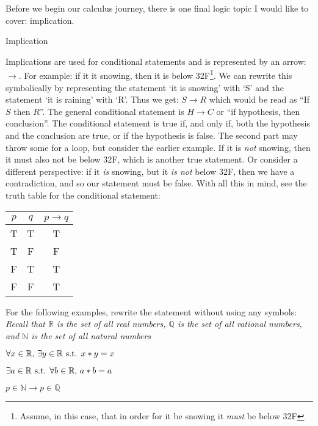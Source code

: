 Before we begin our calculus journey, there is one final logic topic I would like to cover: implication. 

\begin{definition}{Implication}{}
  
  Implications are used for conditional statements and is represented by an arrow: $\to$. For example: if it it snowing, then it is below 32\degree F\footnote{Assume, in this case, that in order for it be snowing it \textit{must} be below 32\degree F}. We can rewrite this symbolically by representing the statement `it is snowing' with `S' and the statement `it is raining' with `R'. Thus we get: $S \to R$ which would be read as ``If $S$ then $R$''. The general conditional statement is $H \to C$ or ``if hypothesis, then conclusion''. The conditional statement is true if, and only if, both the hypothesis and the conclusion are true, or if the hypothesis is false. The second part may throw some for a loop, but consider the earlier example. If it is \textit{not} snowing, then it must also not be below 32\degree F, which is another true statement. Or consider a different perspective: if it \textit{is} snowing, but it \textit{is not} below 32\degree F, then we have a contradiction, and so our statement must be false. With all this in mind, see the truth table for the conditional statement:
  \vspace{0.01in}
  \begin{center}
    \begin{tabular}{ |c|c|c| } 
      \hline
      $p$ & $q$ & $p \to q$ \\ 
      \hline
      T & T & T \\ 
      T & F & F \\ 
      F & T & T \\ 
      F & F & T \\ 
      \hline
    \end{tabular}
  \end{center}
  \vspace{0.01in}
\end{definition}

For the following examples, rewrite the statement without using any symbols: \\
\small \textit{Recall that $\mathbb{R}$ is the set of all real numbers, $\mathbb{Q}$ is the set of all rational numbers, and $\mathbb{N}$ is the set of all natural numbers}
\begin{questions}
  \question $\forall x \in \mathbb{R}\text{, } \exists y \in \mathbb{R} \text{ s.t. } x * y = x$
  \qspace
  
  \question $\exists a \in \mathbb{R} \text{ s.t. } \forall b \in \mathbb{R}\text{, } a * b = a$ 
  \qspace

  \question $p \in \mathbb{N} \to p \in \mathbb{Q}$
  \qspace
\end{questions}
